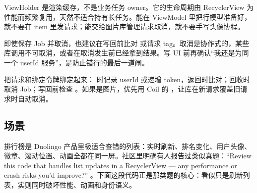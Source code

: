 \begin{idea}[列表项不该拥有异步任务的所有权]
ViewHolder 是渲染缓存，不是业务任务 owner。它的生命周期由 RecyclerView 为性能而频繁复用，天然不适合持有长任务。能在 ViewModel 里把行模型准备好，就不要在 item 里发请求；能交给图片库管理请求取消，就不要手写头像协程。
\end{idea}

\begin{pitfall}[取消不等于校验可以省略]
即使保存 Job 并取消，也建议在写回前比对  或请求 tag。取消是协作式的，某些库调用不可取消，或者在取消发生前已经拿到结果。写 UI 前再确认“我还是为同一个 userId 服务”，是防止错行的最后一道闸。
\end{pitfall}

\begin{followup}
把请求和绑定令牌绑定起来： 时记录 userId 或递增 token，返回时比对；回收时取消 Job；写回前检查 。如果是图片，优先用 Coil 的 ，让库在新请求覆盖旧请求时自动取消。
\end{followup}


\subsection*{场景}
排行榜是 Duolingo 产品里极适合查错的列表：实时刷新、排名变化、用户头像、徽章、滚动位置、动画全都在同一屏。社区里明确有人报告过类似真题：“Review this code that handles list updates in a RecyclerView — any performance or crash risks you'd improve?” \srccommunity。下面这段代码正是那类题的核心：看似只是刷新列表，实则同时破坏性能、动画和身份语义。

